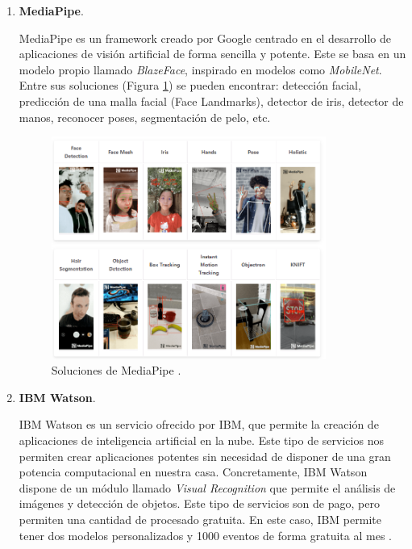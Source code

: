 \begin{enumerate}
	\item \textbf{MediaPipe}.
	
	MediaPipe \cite{mediapipe} es un framework creado por Google centrado en el desarrollo de aplicaciones de visión artificial de forma sencilla y potente. Este se basa en un modelo propio llamado \textit{BlazeFace}, inspirado en modelos como \textit{MobileNet}. Entre sus soluciones (Figura \ref{fig:solMed}) se pueden encontrar: detección facial, predicción de una malla facial (Face Landmarks), detector de iris, detector de manos, reconocer poses, segmentación de pelo, etc.
	
	\begin{figure}[htp]
		\centering
		\includegraphics[width=9cm]{imagenes/solucionesMediaPipe.png}
		\caption{Soluciones de MediaPipe \cite{mdSolutions}.}
		\label{fig:solMed}
	\end{figure}
	
	\item \textbf{IBM Watson}.
	
	IBM Watson es un servicio ofrecido por IBM, que permite la creación de aplicaciones de inteligencia artificial en la nube. Este tipo de servicios nos permiten crear aplicaciones potentes sin necesidad de disponer de una gran potencia computacional en nuestra casa. Concretamente, IBM Watson dispone de un módulo llamado \textit{Visual Recognition} que permite el análisis de imágenes y detección de objetos. Este tipo de servicios son de pago, pero permiten una cantidad de procesado gratuita. En este caso, IBM permite tener dos modelos personalizados y 1000 eventos de forma gratuita al mes \cite{ibm}. 
\end{enumerate}



